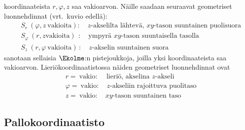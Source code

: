 koordinaateista $r,\varphi,z$ saa vakioarvon. Näille saadaan seuraavat geometriset luonnehdinnat
(vrt.\ kuvio edellä):
\begin{align*}
&S_r\       (\varphi,z\ \text{vakioita}): \quad \text{$z$-akselilta lähtevä, 
                                                      $xy$-tason suuntainen puolisuora} \\
&S_\varphi\ (r,z \text{vakioita})\,\ :  \quad \text{ympyrä $xy$-tason suuntaisella tasolla} \\
&S_z\       (r,\varphi\ \text{vakioita})\, : \quad \text{$z$-akselin suuntainen suora}
\end{align*}
 sanotaan sellaisia $\Ekolme$:n pistejoukkoja, joilla yksi
koordinaateista saa vakioarvon. Lieriökoordinaatistossa näiden geometriset luonnehdinnat ovat
\begin{align*}
&r=\ \text{vakio}:       \quad\, \text{lieriö, akselina $z$-akseli} \\
&\varphi=\ \text{vakio}: \quad   \text{$z$-akseliin rajoittuva puolitaso} \\
&z=\ \text{vakio}:       \quad   \text{$xy$-tason suuntainen taso}
\end{align*}

\subsection*{Pallokoordinaatisto}

